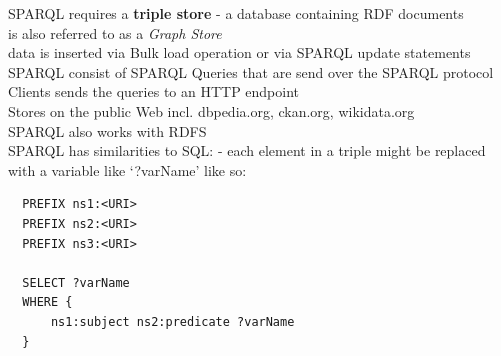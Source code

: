 SPARQL requires a \textbf{triple store} - a database containing RDF documents \\
is also referred to as a \textit{Graph Store} \\
data is inserted via Bulk load operation or via SPARQL update statements \\
SPARQL consist of SPARQL Queries that are send over the SPARQL protocol \\
Clients sends the queries to an HTTP endpoint \\
Stores on the public Web incl. dbpedia.org, ckan.org, wikidata.org \\
SPARQL also works with RDFS \\
SPARQL has similarities to SQL:
- each element in a triple might be replaced with a variable like `?varName' like so: \\
\begin{verbatim}
  PREFIX ns1:<URI>
  PREFIX ns2:<URI>
  PREFIX ns3:<URI>

  SELECT ?varName
  WHERE {
      ns1:subject ns2:predicate ?varName
  }
\end{verbatim}

